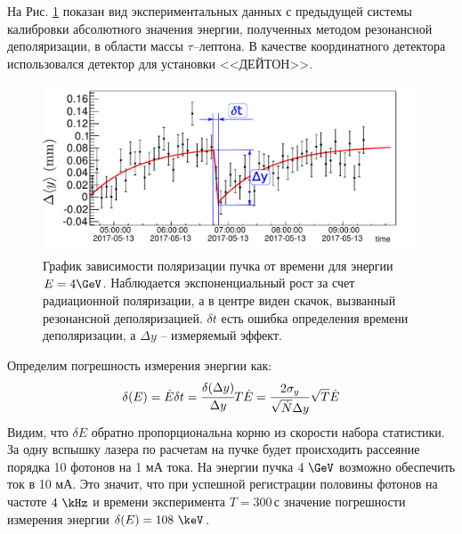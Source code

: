 На Рис. \ref{fig:RD_effect_graph} показан вид экспериментальных данных с предыдущей системы калибровки абсолютного значения энергии, полученных методом резонансной деполяризации, в области массы $\tau$--лептона. В качестве координатного детектора использовался детектор для установки <<ДЕЙТОН>>.
\begin{figure}[H]
	\begin{center}
		\includegraphics[width = 16cm]{img/rd_exp.pdf}
		\caption{График зависимости поляризации пучка от времени для энергии $E = 4 \GeV$. Наблюдается экспоненциальный рост за счет радиационной поляризации, а в центре виден скачок, вызванный резонансной деполяризацией. $\delta t$ есть ошибка определения времени деполяризации, а $\Delta y$ -- измеряемый эффект.}
		\label{fig:RD_effect_graph}
	\end{center}
\end{figure}
\vspace{-20pt}
\noindent Определим погрешность измерения энергии как: 
\begin{equation}
\delta(E)= \dot{E} \delta t = \cfrac{\delta(\Delta y)}{\Delta y}T\dot{E} = \frac{2 \sigma_y}{\sqrt{\dot{N}} \Delta y}\sqrt{T}\dot{E}  
\end{equation}
Видим, что $\delta E$ обратно пропорциональна корню из скорости набора статистики. За одну вспышку лазера по расчетам на пучке будет происходить рассеяние порядка 10 фотонов на 1 мА тока. На энергии пучка $4~\GeV$ возможно обеспечить ток в 10 мА. Это значит, что при успешной регистрации половины фотонов на частоте $4~\kHz$ и времени эксперимента $ T = 300$\,с значение погрешности измерения энергии $\delta(E)= 108~\keV$.
 
